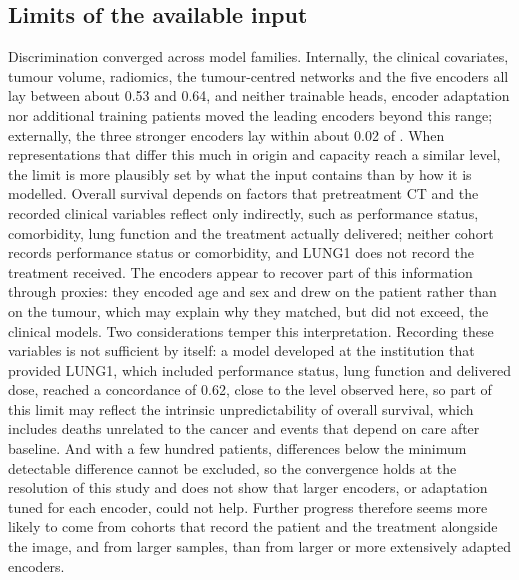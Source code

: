 \subsection{Limits of the available input}
Discrimination converged across model families. Internally, the clinical covariates, tumour volume, radiomics, the tumour-centred networks and the five encoders all lay between about 0.53 and 0.64, and neither trainable heads, encoder adaptation nor additional training patients moved the leading encoders beyond this range; externally, the three stronger encoders lay within about 0.02 of . When representations that differ this much in origin and capacity reach a similar level, the limit is more plausibly set by what the input contains than by how it is modelled. Overall survival depends on factors that pretreatment CT and the recorded clinical variables reflect only indirectly, such as performance status, comorbidity, lung function and the treatment actually delivered; neither cohort records performance status or comorbidity, and LUNG1 does not record the treatment received. The encoders appear to recover part of this information through proxies: they encoded age and sex and drew on the patient rather than on the tumour, which may explain why they matched, but did not exceed, the clinical models. Two considerations temper this interpretation. Recording these variables is not sufficient by itself: a model developed at the institution that provided LUNG1, which included performance status, lung function and delivered dose, reached a concordance of 0.62,\cite{oberije2015} close to the level observed here, so part of this limit may reflect the intrinsic unpredictability of overall survival, which includes deaths unrelated to the cancer and events that depend on care after baseline. And with a few hundred patients, differences below the minimum detectable difference cannot be excluded, so the convergence holds at the resolution of this study and does not show that larger encoders, or adaptation tuned for each encoder, could not help. Further progress therefore seems more likely to come from cohorts that record the patient and the treatment alongside the image, and from larger samples, than from larger or more extensively adapted encoders.

